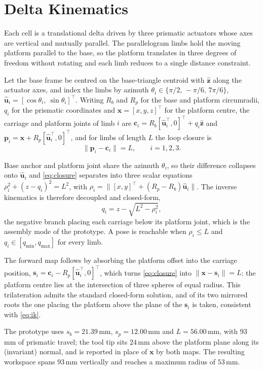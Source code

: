 \section{Delta Kinematics}
\label{sec:kinematics}

Each cell is a translational delta driven by three prismatic actuators whose
axes are vertical and mutually parallel. The parallelogram limbs hold the
moving platform parallel to the base, so the platform translates in three
degrees of freedom without rotating and each limb reduces to a single distance
constraint.

Let the base frame be centred on the base-triangle centroid with
$\hat{\mathbf{z}}$ along the actuator axes, and index the limbs by azimuth
$\theta_i\in\{\pi/2,\,-\pi/6,\,7\pi/6\}$, $\hat{\mathbf{u}}_i=[\cos\theta_i,\
\sin\theta_i]^{\!\top}$. Writing $R_b$ and $R_p$ for the base and platform
circumradii, $q_i$ for the prismatic coordinates and $\mathbf{x}=[x,y,z]^{\!\top}$
for the platform centre, the carriage and platform joints of limb $i$ are
$\mathbf{c}_i=R_b[\hat{\mathbf{u}}_i^{\!\top},0]^{\!\top}+q_i\hat{\mathbf{z}}$ and
$\mathbf{p}_i=\mathbf{x}+R_p[\hat{\mathbf{u}}_i^{\!\top},0]^{\!\top}$, and for
limbs of length $L$ the loop closure is
\begin{equation}
\label{eq:closure}
\|\mathbf{p}_i-\mathbf{c}_i\|=L,\qquad i=1,2,3 .
\end{equation}

Base anchor and platform joint share the azimuth $\theta_i$, so their
difference collapses onto $\hat{\mathbf{u}}_i$ and \eqref{eq:closure} separates
into three scalar equations $\rho_i^2+(z-q_i)^2=L^2$, with
$\rho_i=\|[x,y]^{\!\top}+(R_p-R_b)\hat{\mathbf{u}}_i\|$. The inverse kinematics
is therefore decoupled and closed-form,
\begin{equation}
\label{eq:ik}
q_i=z-\sqrt{L^2-\rho_i^2},
\end{equation}
the negative branch placing each carriage below its platform joint, which is
the assembly mode of the prototype. A pose is reachable when $\rho_i\le L$ and
$q_i\in[q_{\min},q_{\max}]$ for every limb.

The forward map follows by absorbing the platform offset into the carriage
position, $\mathbf{s}_i=\mathbf{c}_i-R_p[\hat{\mathbf{u}}_i^{\!\top},0]^{\!\top}$,
which turns \eqref{eq:closure} into $\|\mathbf{x}-\mathbf{s}_i\|=L$: the
platform centre lies at the intersection of three spheres of equal radius. This
trilateration admits the standard closed-form solution, and of its two mirrored
roots the one placing the platform above the plane of the $\mathbf{s}_i$ is
taken, consistent with \eqref{eq:ik}.

The prototype uses $s_b=21.39$\,mm, $s_p=12.00$\,mm and $L=56.00$\,mm, with
$93$\,mm of prismatic travel; the tool tip sits $24$\,mm above the platform
plane along its (invariant) normal, and is reported in place of $\mathbf{x}$ by
both maps. The resulting workspace spans $93$\,mm vertically and reaches a
maximum radius of $53$\,mm.
